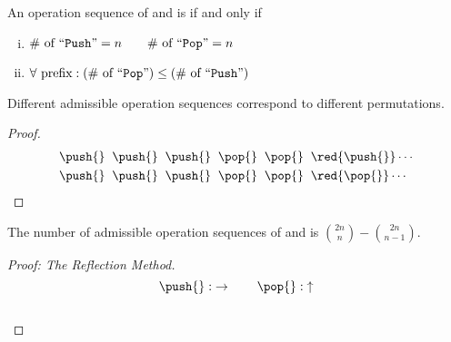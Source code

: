 \begin{frame}{}
  \begin{definition}
    An operation sequence of  and  is  if and only if
    \begin{enumerate}[(i)]
      \pause
      \item $\# \text{ of ``\texttt{Push}''} = n \qquad \# \text{ of ``\texttt{Pop}''} = n$
      \pause
      \item $\forall \text{ prefix}: (\# \text{ of ``\texttt{Pop}''}) \le (\# \text{ of ``\texttt{Push}''})$
    \end{enumerate}
  \end{definition}

  \vspace{0.50cm}
  \pause
  \centerline{}
\end{frame}

\begin{frame}{}
  \begin{theorem}
    Different admissible operation sequences correspond to different permutations.
  \end{theorem}

  \vspace{0.30cm}
  \pause
  \begin{proof}
    \begin{align*}
      &\push{}\; \;\push{}\; \;\push{}\; \;\pop{}\; \;\pop{}\; \;\red{\push{}} \cdots \\
      &\push{}\; \;\push{}\; \;\push{}\; \;\pop{}\; \;\pop{}\; \;\red{\pop{}} \cdots \\
    \end{align*}
  \end{proof}
\end{frame}

\begin{frame}{}
  \begin{theorem}
    The number of admissible operation sequences of \texttt{\it {}} and \texttt{\it {}} is ${2n \choose n} - {2n \choose n-1}$.
  \end{theorem}

  \pause
  \begin{proof}[Proof: The Reflection Method]
    \[
      \push{}: \;\rightarrow \qquad \pop{}: \;\uparrow
    \]

    \begin{columns}
      \pause
	\begin{center}
	  \resizebox{0.80\textwidth}{!}{}
	\end{center}
    \end{columns}
  \end{proof}
\end{frame}

